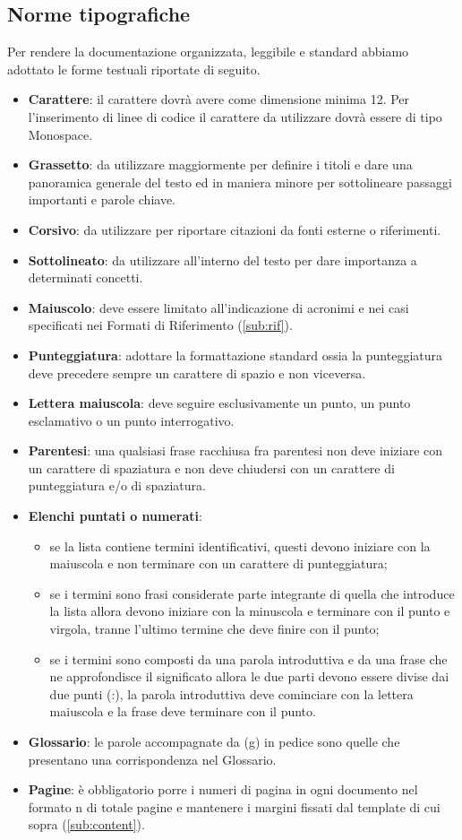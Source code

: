 {		\subsection{Norme tipografiche}{
			\label{sub:typo}
			Per rendere la documentazione organizzata, leggibile e standard abbiamo adottato le forme testuali riportate di seguito.
			\begin{itemize}
				\item \textbf{Carattere}: il carattere dovrà avere come dimensione minima 12. Per l'inserimento di linee di codice il carattere da utilizzare dovrà essere di tipo Monospace.
				\item \textbf{Grassetto}: da utilizzare maggiormente per definire i titoli e dare una panoramica generale del testo ed in maniera minore per sottolineare passaggi importanti e parole chiave.
				\item \textbf{Corsivo}: da utilizzare per riportare citazioni da fonti esterne o riferimenti.
				\item \textbf{Sottolineato}: da utilizzare all'interno del testo per dare importanza a determinati concetti.
				\item \textbf{Maiuscolo}: deve essere limitato all’indicazione di acronimi e nei casi specificati nei Formati di Riferimento (\ref{sub:rif}).
				\item \textbf{Punteggiatura}: adottare la formattazione standard ossia la punteggiatura deve precedere sempre un carattere di spazio e non viceversa.
				\item \textbf{Lettera maiuscola}: deve seguire esclusivamente un punto, un punto esclamativo o un punto interrogativo.
				\item \textbf{Parentesi}: una qualsiasi frase racchiusa fra parentesi non deve iniziare con un carattere di spaziatura e non deve chiudersi con un carattere di punteggiatura e/o di spaziatura.
				\item \textbf{Elenchi puntati o numerati}:
					\begin{itemize}
						\item se la lista contiene termini identificativi, questi devono iniziare con la maiuscola e non terminare con un carattere di punteggiatura;
						\item se i termini sono frasi considerate parte integrante di quella che introduce la lista allora devono iniziare con la minuscola e terminare con il punto e virgola, tranne l’ultimo termine che deve finire con il punto;
						\item se i termini sono composti da una parola introduttiva e da una frase che ne approfondisce il significato allora le due parti devono essere divise dai due punti (:), la parola introduttiva deve cominciare con la lettera maiuscola e la frase deve terminare con il punto.
					\end{itemize}
				\item \textbf{Glossario}: le parole accompagnate da (g) in pedice sono quelle che presentano una corrispondenza nel Glossario.
				\item \textbf{Pagine}: è obbligatorio porre i numeri di pagina in ogni documento nel formato {n} di {totale pagine} e mantenere i margini fissati dal template di cui sopra (\ref{sub:content}).
			\end{itemize}
		}
}
